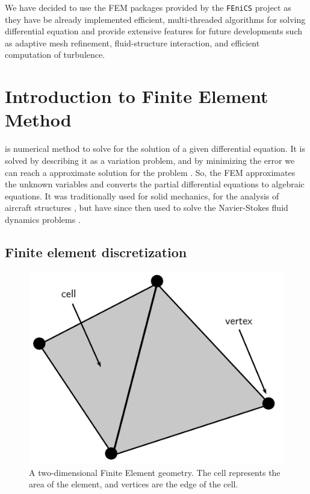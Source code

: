 We have decided to use the FEM packages provided by the \texttt{FEniCS} project as they have be already implemented efficient, multi-threaded algorithms for solving differential equation and provide extensive features for future developments such as adaptive mesh refinement, fluid-structure interaction, and efficient computation of turbulence.

\section{Introduction to Finite Element Method}

 is numerical method to solve for the solution of a given differential equation. It is solved by describing it as a variation problem, and by minimizing the error we can reach a approximate solution for the problem \cite{Brenner2008}. So, the FEM approximates the unknown variables and converts the partial differential equations to algebraic equations. It was traditionally used for solid mechanics, for the analysis of aircraft structures \cite{Rao2005}, but have since then used to solve the Navier-Stokes fluid dynamics problems \cite{Guermond2006} \cite{Johnston2004} \cite{Guermond2003}.

\subsection*{Finite element discretization}

	\begin{figure}[!t]
	\centering
	\includegraphics[width=0.4\linewidth]{./figures/eulerian/finiteElementDefinitions.pdf}
	\caption{A two-dimensional Finite Element geometry. The cell represents the area of the element, and vertices are the edge of the cell.}
	\label{fig:finiteElementDefinitions}
	\end{figure}

